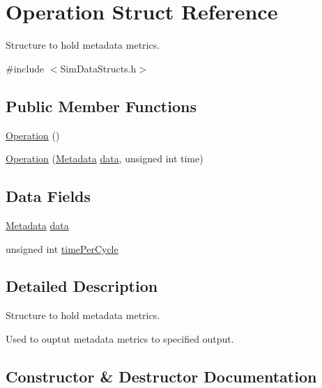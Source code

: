 \hypertarget{struct_operation}{}\section{Operation Struct Reference}
\label{struct_operation}


Structure to hold metadata metrics.  




{\ttfamily \#include $<$Sim\+Data\+Structs.\+h$>$}

\subsection*{Public Member Functions}
\begin{DoxyCompactItemize}
\item 
\hyperlink{struct_operation_a55f76bcb8990f4dba577990af0c8399e}{Operation} ()
\item 
\hyperlink{struct_operation_a9fb1b5e49564f3b8e5f9b05a133bd3e8}{Operation} (\hyperlink{struct_metadata}{Metadata} \hyperlink{struct_operation_a133be6e6b21e5606f20fcf22a884d1c7}{data}, unsigned int time)
\end{DoxyCompactItemize}
\subsection*{Data Fields}
\begin{DoxyCompactItemize}
\item 
\hyperlink{struct_metadata}{Metadata} \hyperlink{struct_operation_a133be6e6b21e5606f20fcf22a884d1c7}{data}
\item 
unsigned int \hyperlink{struct_operation_a0cdc628f45dec91256582c43dfe18e1d}{time\+Per\+Cycle}
\end{DoxyCompactItemize}


\subsection{Detailed Description}
Structure to hold metadata metrics. 

Used to ouptut metadata metrics to specified output. 

\subsection{Constructor \& Destructor Documentation}
\hypertarget{struct_operation_a55f76bcb8990f4dba577990af0c8399e}{}\label{struct_operation_a55f76bcb8990f4dba577990af0c8399e} 
